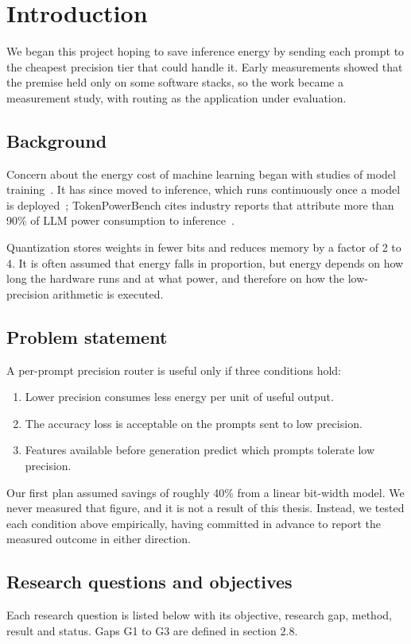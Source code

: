 \chapter{Introduction}
We began this project hoping to save inference energy by sending each prompt to the cheapest precision tier that could handle it. Early measurements showed that the premise held only on some software stacks, so the work became a measurement study, with routing as the application under evaluation.

\section{Background}
Concern about the energy cost of machine learning began with studies of model training~\cite{b1,b2,b3}. It has since moved to inference, which runs continuously once a model is deployed~\cite{b5}; TokenPowerBench cites industry reports that attribute more than 90\% of LLM power consumption to inference~\cite{b7}.

Quantization stores weights in fewer bits and reduces memory by a factor of 2 to 4. It is often assumed that energy falls in proportion, but energy depends on how long the hardware runs and at what power, and therefore on how the low-precision arithmetic is executed.

\section{Problem statement}
A per-prompt precision router is useful only if three conditions hold:

\begin{enumerate}
\item Lower precision consumes less energy per unit of useful output.
\item The accuracy loss is acceptable on the prompts sent to low precision.
\item Features available before generation predict which prompts tolerate low precision.
\end{enumerate}
Our first plan assumed savings of roughly 40\% from a linear bit-width model. We never measured that figure, and it is not a result of this thesis. Instead, we tested each condition above empirically, having committed in advance to report the measured outcome in either direction.

\section{Research questions and objectives}
Each research question is listed below with its objective, research gap, method, result and status. Gaps G1 to G3 are defined in section 2.8.


